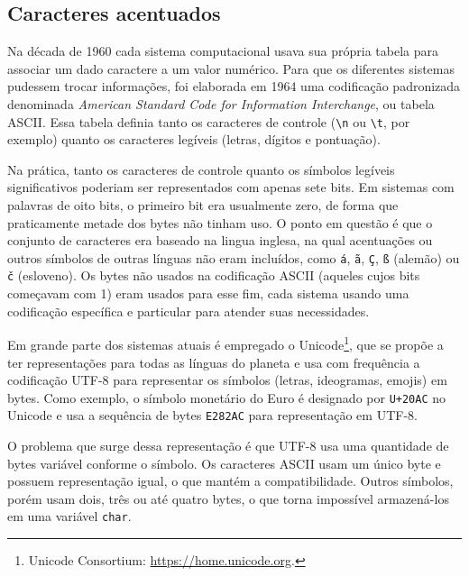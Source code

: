 \documentclass[
  11pt,
  a4paper,
]{scrbook}
\begin{document}
\subsection{Caracteres acentuados}\label{sec-caracteres-acentuados}

Na década de 1960 cada sistema computacional usava sua própria tabela
para associar um dado caractere a um valor numérico. Para que os
diferentes sistemas pudessem trocar informações, foi elaborada em 1964
uma codificação padronizada denominada \emph{American Standard Code for
Information Interchange}, ou tabela ASCII. Essa tabela definia tanto os
caracteres de controle (\texttt{\textbackslash{}n} ou
\texttt{\textbackslash{}t}, por exemplo) quanto os caracteres legíveis
(letras, dígitos e pontuação).

Na prática, tanto os caracteres de controle quanto os símbolos legíveis
significativos poderiam ser representados com apenas sete bits. Em
sistemas com palavras de oito bits, o primeiro bit era usualmente zero,
de forma que praticamente metade dos bytes não tinham uso. O ponto em
questão é que o conjunto de caracteres era baseado na lingua inglesa, na
qual acentuações ou outros símbolos de outras línguas não eram
incluídos, como \texttt{á}, \texttt{ã}, \texttt{Ç}, \texttt{ß} (alemão)
ou \texttt{č} (esloveno). Os bytes não usados na codificação ASCII
(aqueles cujos bits começavam com 1) eram usados para esse fim, cada
sistema usando uma codificação específica e particular para atender suas
necessidades.

  Em grande parte dos sistemas atuais é
empregado o Unicode\footnote{Unicode Consortium:
  \url{https://home.unicode.org}.}, que se propõe a ter representações
para todas as línguas do planeta e usa com frequência a codificação
UTF-8 para representar os símbolos (letras, ideogramas, emojis) em
bytes. Como exemplo, o símbolo monetário do Euro é designado por
\texttt{U+20AC} no Unicode e usa a sequência de bytes \texttt{E282AC}
para representação em UTF-8.

O problema que surge dessa representação é que UTF-8 usa uma quantidade
de bytes variável conforme o símbolo. Os caracteres ASCII usam um único
byte e possuem representação igual, o que mantém a compatibilidade.
Outros símbolos, porém usam dois, três ou até quatro bytes, o que torna
impossível armazená-los em uma variável \texttt{char}.
\end{document}
